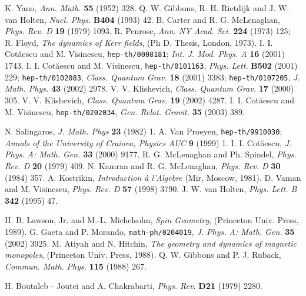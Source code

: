 \documentclass[a4paper,12pt]{article}
\begin{document}
\begin{thebibliography}{99}
K. Yano, {\em Ann. Math.} {\bf 55} (1952) 328.
%
Q. W. Gibbons, R. H. Rietdijk and J. W. van Holten, 
{\em Nucl. Phys.} {\bf B404} (1993) 42.
%
B. Carter and R. G. McLenaghan, {\em Phys. Rev. D} {\bf 19} (1979) 1093.
%
R. Penrose, {\em Ann. NY Acad. Sci.} {\bf 224} (1973) 125;
R. Floyd, {\em The dynamics of Kerr fields}, (Ph D. Thesis, London,
1973).
%
I.  I.  Cot\u aescu and M.  Visinescu,
{\tt hep-th/0008181}; {\em Int.  J.  Mod.  Phys.  A} {\bf 16} (2001) 1743. 
%
I.  I.  Cot\u aescu and M.  Visinescu, 
{\tt hep-th/0101163}, {\em Phys. Lett.} {\bf B502} (2001) 229; 
{\tt hep-th/0102083}, {\em Class. Quantum Grav.} {\bf 18} (2001) 3383;  
{\tt hep-th/0107205}, {\em J. Math. Phys.} {\bf 43} (2002) 2978. 
%
V. V. Klishevich, {\em Class. Quantum Grav.} {\bf 17} (2000) 305.
%
V. V. Klishevich, {\em Class. Quantum Grav.} {\bf 19} (2002) 4287.
I.  I.  Cot\u aescu and M.  Visinescu, {\tt hep-th/0202034},
{\em Gen.  Relat.  Gravit.} {\bf 35} (2003) 389. 
%

N. Salingaros, {\em J. Math. Phys} {\bf 23} (1982) 1.
%
A. Van Proeyen, {\tt hep-th/9910030}; {\em Annals of the University of 
Craiova, Physics AUC} {\bf 9} (1999) 1.
%
I. I. Cot\u aescu, {\em J. Phys. A: Math. Gen.} {\bf 33} (2000) 9177.
%
R. G. McLenaghan and Ph. Spindel, {\em Phys. Rev. D} {\bf 20} (1979) 409.  
%
N. Kamran and R. G. McLenaghan, {\em Phys. Rev. D} {\bf 30} (1984) 357.
%
A. Kostrikin, {\em Introduction \` a l'Algebre} (Mir, Moscow, 1981).
%
D. Vaman  and M. Visinescu, {\em Phys. Rev. D} {\bf 57} (1998) 3790.
%
J. W. van Holten, {\em Phys. Lett. B} {\bf 342} (1995) 47.
%


H. B. Lawson, Jr. and M.-L. Michelsohn, {\em Spin Geometry}, 
(Princeton Univ. Press, 1989).
%
G. Gaeta and P. Morando, {\tt math-ph/0204019}, 
{\em J. Phys. A: Math. Gen.} {\bf 35} (2002) 3925. 
%
M. Atiyah and N. Hitchin, {\em The geometry and dynamics of magnetic  
monopoles}, (Princeton Univ. Press, 1988).
%
Q. W. Gibbons and P. J. Ruback, 
{\em Commun. Math. Phys.} {\bf 115} (1988) 267.
%

H.  Boutaleb - Joutei and A.  Chakrabarti, {\em Phys.  Rev.} {\bf D21} 
(1979) 2280.
\end{thebibliography}
\end{document}
